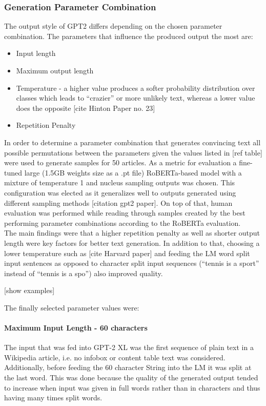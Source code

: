 \subsubsection{Generation Parameter Combination}
\label{sub:generation_parameter_combination}

The output style of GPT2 differs depending on the chosen parameter combination. The parameters that influence the produced output the most are:
\begin{itemize}
    \item Input length
    \item Maximum output length
    \item Temperature - a higher value produces a softer probability distribution over classes which leads to “crazier” or more unlikely text, 
    whereas a lower value does the opposite [cite Hinton Paper no. 23]
    \item Repetition Penalty
\end{itemize}

In order to determine a parameter combination that generates convincing text all possible permutations between the parameters given the values 
listed in [ref table] were used to generate samples for 50 articles. As a metric for evaluation a fine-tuned large (1.5GB weights size as a .pt file) 
RoBERTa-based model with a mixture of temperature 1 and nucleus sampling outputs was chosen. This configuration was elected as it generalizes well 
to outputs generated using different sampling methods [citation gpt2 paper]. On top of that, human evaluation was performed while reading through 
samples created by the best performing parameter combinations according to the RoBERTa evaluation. \\
The main findings were that a higher repetition penalty as well as shorter output length were key factors for better text generation. In 
addition to that, choosing a lower temperature such as [cite Harvard paper] and feeding the LM word split input sentences as opposed to 
character split input sequences (“tennis is a sport” instead of “tennis is a spo”) also improved quality.

[show examples]

The finally selected parameter values were:

\paragraph*{Maximum Input Length - 60 characters}
The input that was fed into GPT-2 XL was the first sequence of plain text in a Wikipedia article, i.e. no infobox or content table text was 
considered. Additionally, before feeding the 60 character String into the LM it was split at the last word. This was done because the quality 
of the generated output tended to increase when input was given in full words rather than in characters and thus having many times split words.

